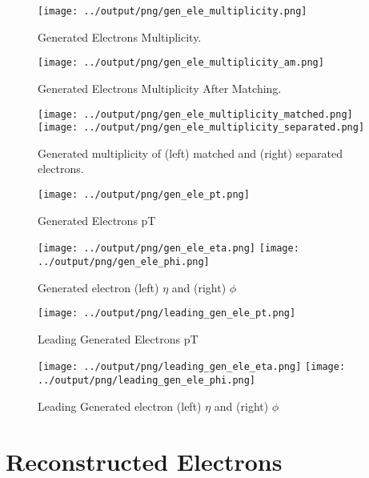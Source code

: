 \documentclass[11pt]{book}
\begin{document}
\begin{figure}[htb]
\centering
\texttt{[image: ../output/png/gen\_ele\_multiplicity.png]}
\caption{Generated Electrons Multiplicity.}
\label{fig:gen_ele_multiplicity}
\end{figure}

\begin{figure}[htb]
\centering
\texttt{[image: ../output/png/gen\_ele\_multiplicity\_am.png]}
\caption{Generated Electrons Multiplicity After Matching.}
\label{fig:gen_ele_multiplicity_am}
\end{figure}


\begin{figure}[htb]
\centering
\texttt{[image: ../output/png/gen\_ele\_multiplicity\_matched.png]}
\texttt{[image: ../output/png/gen\_ele\_multiplicity\_separated.png]}
\caption{Generated multiplicity of (left) matched and (right) separated electrons.}
\label{fig:gn_ele_mat_sep}
\end{figure}

\begin{figure}[htb]
\centering
\texttt{[image: ../output/png/gen\_ele\_pt.png]}
\caption{Generated Electrons pT}
\label{fig:gen_ele_pt}
\end{figure}
\clearpage

\begin{figure}[htb]
\centering
\texttt{[image: ../output/png/gen\_ele\_eta.png]}
\texttt{[image: ../output/png/gen\_ele\_phi.png]}
\caption{Generated electron (left) $\eta$ and (right) $\phi$}
\label{fig:gen_ele_eta_phi}
\end{figure}

\begin{figure}[htb]
\centering
\texttt{[image: ../output/png/leading\_gen\_ele\_pt.png]}
\caption{Leading Generated Electrons pT}
\label{fig:leading_gen_ele_pt}
\end{figure}

\begin{figure}[htb]
\centering
\texttt{[image: ../output/png/leading\_gen\_ele\_eta.png]}
\texttt{[image: ../output/png/leading\_gen\_ele\_phi.png]}
\caption{Leading Generated electron (left) $\eta$ and (right) $\phi$}
\label{fig:leading_gen_ele_eta_phi}
\end{figure}
\clearpage

\section{Reconstructed Electrons}
\end{document}
